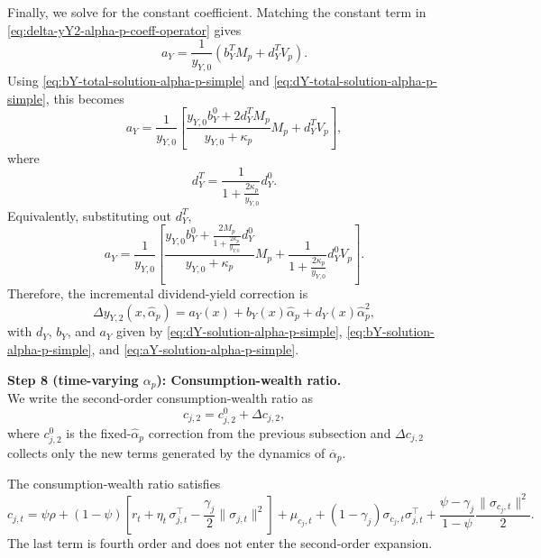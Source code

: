 Finally, we solve for the constant coefficient.
Matching the constant term in \eqref{eq:delta-yY2-alpha-p-coeff-operator} gives
\begin{equation}
    a_Y
    =\frac{1}{y_{Y,0}}\left(b_Y^T M_p+d_Y^T V_p\right).
\end{equation}
Using \eqref{eq:bY-total-solution-alpha-p-simple} and \eqref{eq:dY-total-solution-alpha-p-simple}, this becomes
\begin{equation}\label{eq:aY-solution-alpha-p-simple}
    a_Y
    =\frac{1}{y_{Y,0}}\left[
        \frac{y_{Y,0}b_Y^{0}+2d_Y^T M_p}{y_{Y,0}+\kappa_p}M_p
        +d_Y^T V_p
    \right],
\end{equation}
where
\begin{equation}
    d_Y^T=\frac{1}{1+\frac{2\kappa_p}{y_{Y,0}}}d_Y^{0}.
\end{equation}
Equivalently, substituting out $d_Y^T$,
\begin{equation}\label{eq:aY-solution-alpha-p-substituted}
    a_Y
    =\frac{1}{y_{Y,0}}\left[
        \frac{y_{Y,0}b_Y^{0}+\frac{2M_p}{1+\frac{2\kappa_p}{y_{Y,0}}}d_Y^{0}}{y_{Y,0}+\kappa_p}M_p
        +\frac{1}{1+\frac{2\kappa_p}{y_{Y,0}}}d_Y^{0}V_p
    \right].
\end{equation}
Therefore, the incremental dividend-yield correction is
\begin{equation}\label{eq:delta-yY2-coeff-solution-alpha-p}
    \Delta y_{Y,2}(x,\hat{\alpha}_p)
    =a_Y(x)+b_Y(x)\hat{\alpha}_p+d_Y(x)\hat{\alpha}_p^2,
\end{equation}
with $d_Y$, $b_Y$, and $a_Y$ given by \eqref{eq:dY-solution-alpha-p-simple}, \eqref{eq:bY-solution-alpha-p-simple}, and \eqref{eq:aY-solution-alpha-p-simple}.

\noindent\textbf{Step 8 (time-varying $\alpha_p$): Consumption-wealth ratio.}\\
We write the second-order consumption-wealth ratio as
\begin{equation}
    c_{j,2}=c_{j,2}^{0}+\Delta c_{j,2},
\end{equation}
where $c_{j,2}^{0}$ is the fixed-$\hat{\alpha}_p$ correction from the previous subsection and $\Delta c_{j,2}$ collects only the new terms generated by the dynamics of $\overline{\alpha}_p$.

The consumption-wealth ratio satisfies
\begin{equation}
    c_{j,t} = \psi \rho 
    + (1-\psi) \left[ r_t + \eta_{t}\,\sigma_{j,t}^\top - \frac{\gamma_j}{2} \|\sigma_{j,t}\|^2 \right] 
    + \mu_{c_j,t} 
    + (1-\gamma_j) \sigma_{c_j,t} \sigma_{j,t}^\top 
    + \frac{\psi - \gamma_j}{1-\psi} \frac{\|\sigma_{c_j,t}\|^2}{2}.
\end{equation}
The last term is fourth order and does not enter the second-order expansion.


